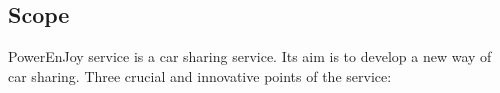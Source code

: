 \documentclass[english]{article}
\newcommand{\staff}{\textit{staff }}
\newcommand{\service}{\textit{service }}
\newcommand{\safeareas}{\textit{safe areas }}
\newcommand{\reservation}{\textit{reservation }}
\begin{document}
 \subsection{Scope}
 

PowerEnJoy service is a car sharing service. Its aim is to develop a new way of car sharing.
Three crucial and innovative points of the service:
\end{document}
